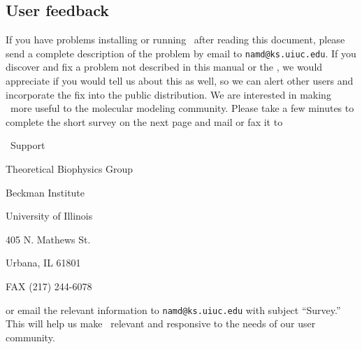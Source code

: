 \subsection{User feedback}

If you have problems installing or running \NAMD\ after
reading this document, please send a
complete description of the problem by email to {\tt namd@ks.uiuc.edu}.  If
you discover and fix a problem not described in this manual or the
\PG, we would
appreciate if you would tell us about this as well, so we can alert
other users and incorporate the fix into the public distribution.
\prettypar
We are interested in making \NAMD\ more useful to the molecular modeling
community.  Please take a few minutes to complete the short survey on
the next page and mail or fax it to

\bigskip

\NAMD\ Support

Theoretical Biophysics Group

Beckman Institute

University of Illinois

405 N. Mathews St.

Urbana, IL  61801

FAX (217) 244-6078

\bigskip

\noindent or email the relevant information
to {\tt namd@ks.uiuc.edu} with subject ``Survey.''  
This will help
us make \NAMD\ relevant and responsive to the needs of our user
community.

